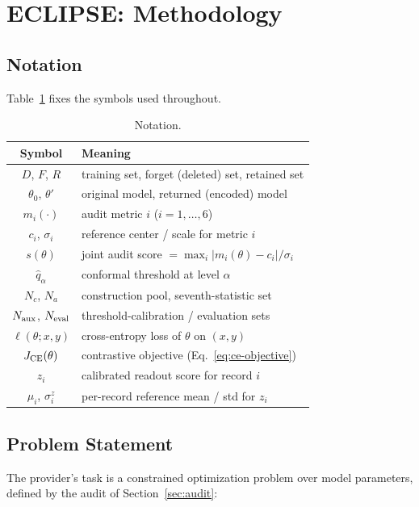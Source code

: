 \documentclass[lettersize,journal]{IEEEtran}
\begin{document}
\section{ECLIPSE: Methodology}\label{sec:method}\label{sec:encoding}

\subsection{Notation}
Table~\ref{tab:notation} fixes the symbols used throughout.

\begin{table}[t]
\caption{Notation.}
\label{tab:notation}
\centering
\small
\begin{tabular}{cl}
\toprule
Symbol & Meaning \\
\midrule
$D$, $F$, $R$ & training set, forget (deleted) set, retained set \\
$\theta_0$, $\theta'$ & original model, returned (encoded) model \\
$m_i(\cdot)$ & audit metric $i$ ($i=1,\dots,6$) \\
$c_i$, $\sigma_i$ & reference center / scale for metric $i$ \\
$s(\theta)$ & joint audit score $= \max_i |m_i(\theta)-c_i|/\sigma_i$ \\
$\hat q_{\alpha}$ & conformal threshold at level $\alpha$ \\
$N_c$, $N_a$ & construction pool, seventh-statistic set \\
$N_{\rm aux}$, $N_{\rm eval}$ & threshold-calibration / evaluation sets \\
$\ell(\theta;x,y)$ & cross-entropy loss of $\theta$ on $(x,y)$ \\
$J_{\rm CE}(\theta)$ & contrastive objective (Eq.~\ref{eq:ce-objective}) \\
$z_i$ & calibrated readout score for record $i$ \\
$\mu_i$, $\sigma^z_i$ & per-record reference mean / std for $z_i$ \\
\bottomrule
\end{tabular}
\end{table}

\subsection{Problem Statement}
\label{sec:problem}
The provider's task is a constrained optimization problem over
model parameters, defined by the audit of
Section~\ref{sec:audit}:
\end{document}

